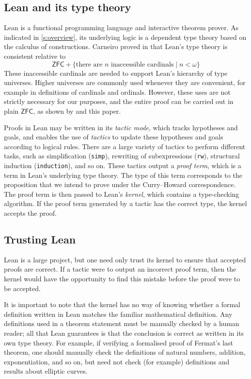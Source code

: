 \subsection{Lean and its type theory}

Lean \cite{lean} is a functional programming language and interactive theorem prover.
As indicated in \cref{s:overview}, its underlying logic is a dependent type theory based on the calculus of constructions.
Carneiro proved in \cite{leantt} that Lean's type theory is consistent relative to
\[ \mathsf{ZFC} + \{ \text{there are } n \text{ inaccessible cardinals} \mid n < \omega \} \]
These inaccessible cardinals are needed to support Lean's hierarchy of type universes.
Higher universes are commonly used whenever they are convenient, for example in definitions of cardinals and ordinals.
However, these uses are not strictly necessary for our purposes, and the entire proof can be carried out in plain \( \mathsf{ZFC} \), as shown by \cite{holmes2023nf} and this paper.

Proofs in Lean may be written in its \emph{tactic mode}, which tracks hypotheses and goals, and enables the use of \emph{tactics} to update these hypotheses and goals according to logical rules.
There are a large variety of tactics to perform different tasks, such as simplification (\texttt{simp}), rewriting of subexpressions (\texttt{rw}), structural induction (\texttt{induction}), and so on.
These tactics output a \emph{proof term}, which is a term in Lean's underlying type theory.
The type of this term corresponds to the proposition that we intend to prove under the Curry--Howard correspondence.
The proof term is then passed to Lean's \emph{kernel}, which contains a type-checking algorithm.
If the proof term generated by a tactic has the correct type, the kernel accepts the proof.

\subsection{Trusting Lean}

Lean is a large project, but one need only trust its kernel to ensure that accepted proofs are correct.
If a tactic were to output an incorrect proof term, then the kernel would have the opportunity to find this mistake before the proof were to be accepted.

It is important to note that the kernel has no way of knowing whether a formal definition written in Lean matches the familiar mathematical definition.
Any definitions used in a theorem statement must be manually checked by a human reader; all that Lean guarantees is that the conclusion is correct as written in its own type theory.
For example, if verifying a formalised proof of Fermat's last theorem, one should manually check the definitions of natural numbers, addition, exponentiation, and so on, but need not check (for example) definitions and results about elliptic curves.


